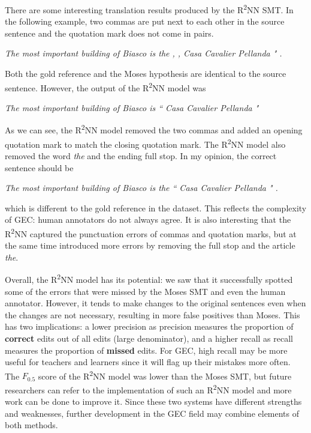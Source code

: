 \documentclass[12pt,a4paper,twoside]{report}
\begin{document}
There are some interesting translation results produced by the R\textsuperscript{2}NN SMT. In the following example, two commas are put next to each other in the source sentence and the quotation mark does not come in pairs.

\begin{center}
    \textit{The most important building of Biasco is the , , Casa Cavalier Pellanda " .}
\end{center}

Both the gold reference and the Moses hypothesis are identical to the source sentence. However, the output of the R\textsuperscript{2}NN model was
\begin{center}
    \textit{The most important building of Biasco is `` Casa Cavalier Pellanda "}
\end{center}

As we can see, the R\textsuperscript{2}NN model removed the two commas and added an opening quotation mark to match the closing quotation mark. The R\textsuperscript{2}NN model also removed the word \textit{the} and the ending full stop. In my opinion, the correct sentence should be
\begin{center}
    \textit{The most important building of Biasco is the `` Casa Cavalier Pellanda " .}
\end{center}
which is different to the gold reference in the dataset. This reflects the complexity of GEC: human annotators do not always agree. It is also interesting that the R\textsuperscript{2}NN captured the punctuation errors of commas and quotation marks, but at the same time introduced more errors by removing the full stop and the article \textit{the}.

Overall, the R\textsuperscript{2}NN model has its potential: we saw that it successfully spotted some of the errors that were missed by the Moses SMT and even the human annotator. However, it tends to make changes to the original sentences even when the changes are not necessary, resulting in more false positives than Moses. This has two implications: a lower precision as precision measures the proportion of \textbf{correct} edits out of all edits (large denominator), and a higher recall as recall measures the proportion of \textbf{missed} edits. For GEC, high recall may be more useful for teachers and learners since it will flag up their mistakes more often. The $F_{0.5}$ score of the R\textsuperscript{2}NN model was lower than the Moses SMT, but future researchers can refer to the implementation of such an R\textsuperscript{2}NN model and more work can be done to improve it. Since these two systems have different strengths and weaknesses, further development in the GEC field may combine elements of both methods.
\end{document}
